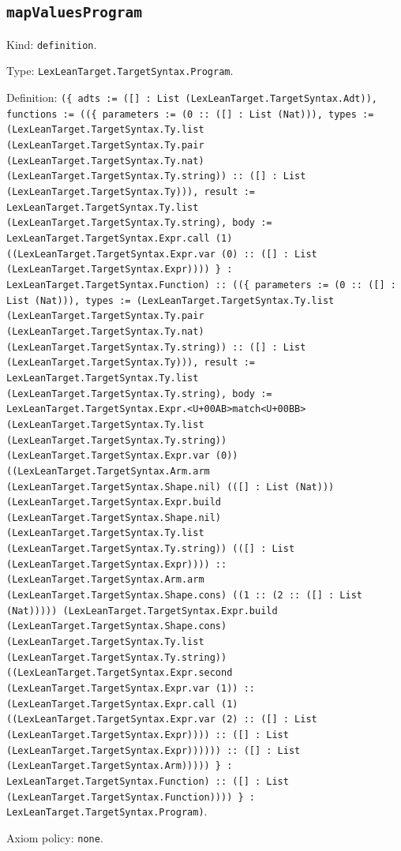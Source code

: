 \documentclass[11pt]{article}
\begin{document}
\subsection*{\texttt{mapValuesProgram}}
\noindent Kind: \texttt{definition}.\par
\noindent Type: \texttt{LexLeanTarget.TargetSyntax.Program}.\par
\noindent Definition: \texttt{(\{ adts := ([] : List (LexLeanTarget.TargetSyntax.Adt)), functions := ((\{ parameters := (0 :: ([] : List (Nat))), types := (LexLeanTarget.TargetSyntax.Ty.list (LexLeanTarget.TargetSyntax.Ty.pair (LexLeanTarget.TargetSyntax.Ty.nat) (LexLeanTarget.TargetSyntax.Ty.string)) :: ([] : List (LexLeanTarget.TargetSyntax.Ty))), result := LexLeanTarget.TargetSyntax.Ty.list (LexLeanTarget.TargetSyntax.Ty.string), body := LexLeanTarget.TargetSyntax.Expr.call (1) ((LexLeanTarget.TargetSyntax.Expr.var (0) :: ([] : List (LexLeanTarget.TargetSyntax.Expr)))) \} : LexLeanTarget.TargetSyntax.Function) :: ((\{ parameters := (0 :: ([] : List (Nat))), types := (LexLeanTarget.TargetSyntax.Ty.list (LexLeanTarget.TargetSyntax.Ty.pair (LexLeanTarget.TargetSyntax.Ty.nat) (LexLeanTarget.TargetSyntax.Ty.string)) :: ([] : List (LexLeanTarget.TargetSyntax.Ty))), result := LexLeanTarget.TargetSyntax.Ty.list (LexLeanTarget.TargetSyntax.Ty.string), body := LexLeanTarget.TargetSyntax.Expr.<U+00AB>match<U+00BB> (LexLeanTarget.TargetSyntax.Ty.list (LexLeanTarget.TargetSyntax.Ty.string)) (LexLeanTarget.TargetSyntax.Expr.var (0)) ((LexLeanTarget.TargetSyntax.Arm.arm (LexLeanTarget.TargetSyntax.Shape.nil) (([] : List (Nat))) (LexLeanTarget.TargetSyntax.Expr.build (LexLeanTarget.TargetSyntax.Shape.nil) (LexLeanTarget.TargetSyntax.Ty.list (LexLeanTarget.TargetSyntax.Ty.string)) (([] : List (LexLeanTarget.TargetSyntax.Expr)))) :: (LexLeanTarget.TargetSyntax.Arm.arm (LexLeanTarget.TargetSyntax.Shape.cons) ((1 :: (2 :: ([] : List (Nat))))) (LexLeanTarget.TargetSyntax.Expr.build (LexLeanTarget.TargetSyntax.Shape.cons) (LexLeanTarget.TargetSyntax.Ty.list (LexLeanTarget.TargetSyntax.Ty.string)) ((LexLeanTarget.TargetSyntax.Expr.second (LexLeanTarget.TargetSyntax.Expr.var (1)) :: (LexLeanTarget.TargetSyntax.Expr.call (1) ((LexLeanTarget.TargetSyntax.Expr.var (2) :: ([] : List (LexLeanTarget.TargetSyntax.Expr)))) :: ([] : List (LexLeanTarget.TargetSyntax.Expr)))))) :: ([] : List (LexLeanTarget.TargetSyntax.Arm))))) \} : LexLeanTarget.TargetSyntax.Function) :: ([] : List (LexLeanTarget.TargetSyntax.Function)))) \} : LexLeanTarget.TargetSyntax.Program)}.\par
\noindent Axiom policy: \texttt{none}.\par
\end{document}
